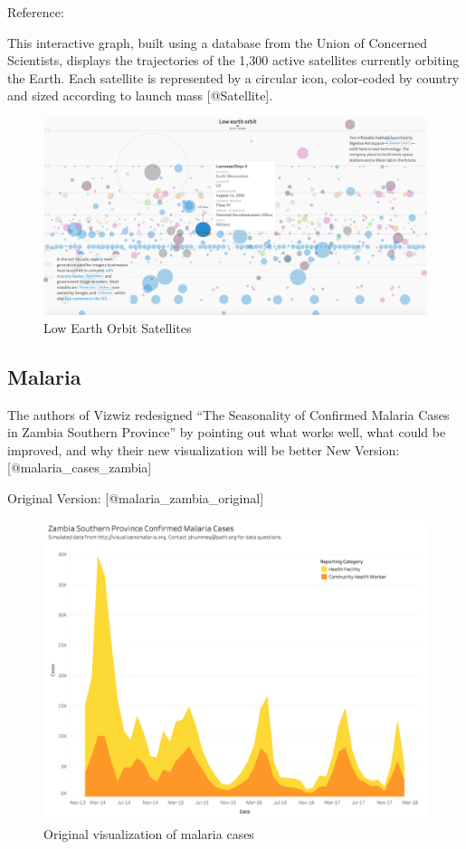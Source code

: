 \documentclass[]{book}
\theoremstyle{definition}
\theoremstyle{definition}
\theoremstyle{definition}
\theoremstyle{remark}
\begin{document}
Reference:

This interactive graph, built using a database from the Union of
Concerned Scientists, displays the trajectories of the 1,300 active
satellites currently orbiting the Earth. Each satellite is represented
by a circular icon, color-coded by country and sized according to launch
mass {[}@Satellite{]}.

\begin{figure}
\centering
\includegraphics{images/satellites.png}
\caption{Low Earth Orbit Satellites}
\end{figure}

\subsection{Malaria}\label{malaria}

The authors of Vizwiz redesigned ``The Seasonality of Confirmed Malaria
Cases in Zambia Southern Province'' by pointing out what works well,
what could be improved, and why their new visualization will be better
New Version: {[}@malaria\_cases\_zambia{]}

Original Version: {[}@malaria\_zambia\_original{]}

\begin{figure}
\centering
\includegraphics{images/malaria_original.png}
\caption{Original visualization of malaria cases}
\end{figure}
\end{document}
